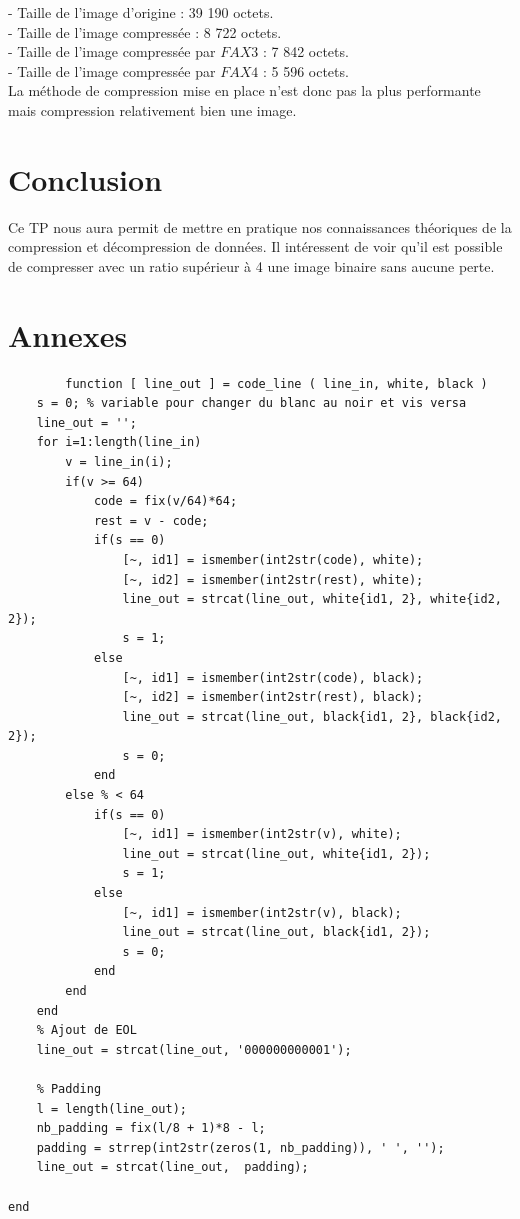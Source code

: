 \documentclass[11pt]{article}
\begin{document}
	- Taille de l'image d'origine : 39 190 octets.\\
	- Taille de l'image compressée : 8 722 octets.\\
	- Taille de l'image compressée par $FAX3$ : 7 842 octets.\\
	- Taille de l'image compressée par $FAX4$ : 5 596 octets.\\
	
	La méthode de compression mise en place n'est donc pas la plus performante mais compression relativement bien une image.

\section{Conclusion}

	Ce TP nous aura permit de mettre en pratique nos connaissances théoriques de la compression et décompression de données. Il intéressent de voir qu'il est possible de compresser avec un ratio supérieur à 4 une image binaire sans aucune perte.

\section{Annexes}

	\begin{lstlisting}
		function [ line_out ] = code_line ( line_in, white, black )
    s = 0; % variable pour changer du blanc au noir et vis versa
    line_out = '';
    for i=1:length(line_in)
        v = line_in(i);
        if(v >= 64)
            code = fix(v/64)*64;
            rest = v - code;
            if(s == 0)
                [~, id1] = ismember(int2str(code), white);
                [~, id2] = ismember(int2str(rest), white);
                line_out = strcat(line_out, white{id1, 2}, white{id2, 2});
                s = 1;
            else
                [~, id1] = ismember(int2str(code), black);
                [~, id2] = ismember(int2str(rest), black);
                line_out = strcat(line_out, black{id1, 2}, black{id2, 2});
                s = 0;
            end
        else % < 64
            if(s == 0)
                [~, id1] = ismember(int2str(v), white);
                line_out = strcat(line_out, white{id1, 2});
                s = 1;
            else
                [~, id1] = ismember(int2str(v), black);
                line_out = strcat(line_out, black{id1, 2});
                s = 0;
            end
        end
    end
    % Ajout de EOL
    line_out = strcat(line_out, '000000000001');
    
    % Padding
    l = length(line_out);
    nb_padding = fix(l/8 + 1)*8 - l;
    padding = strrep(int2str(zeros(1, nb_padding)), ' ', '');
    line_out = strcat(line_out,  padding);
    
end
	\end{lstlisting}
		
\end{document}

